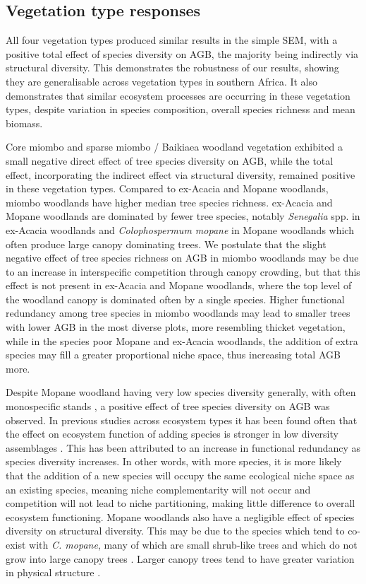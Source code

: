 \documentclass[11pt,a4paper]{article}
\begin{document}
\subsection{Vegetation type responses}

All four vegetation types produced similar results in the simple SEM, with a positive total effect of species diversity on AGB, the majority being indirectly via structural diversity. This demonstrates the robustness of our results, showing they are generalisable across vegetation types in southern Africa. It also demonstrates that similar ecosystem processes are occurring in these vegetation types, despite variation in species composition, overall species richness and mean biomass.

Core miombo and sparse miombo / Baikiaea woodland vegetation exhibited a small negative direct effect of tree species diversity on AGB, while the total effect, incorporating the indirect effect via structural diversity, remained positive in these vegetation types. Compared to ex-Acacia and Mopane woodlands, miombo woodlands have higher median tree species richness. ex-Acacia and Mopane woodlands are dominated by fewer tree species, notably \textit{Senegalia} spp. in ex-Acacia woodlands and \textit{Colophospermum mopane} in Mopane woodlands which often produce large canopy dominating trees. We postulate that the slight negative effect of tree species richness on AGB in miombo woodlands may be due to an increase in interspecific competition through canopy crowding, but that this effect is not present in ex-Acacia and Mopane woodlands, where the top level of the woodland canopy is dominated often by a single species. Higher functional redundancy among tree species in miombo woodlands may lead to smaller trees with lower AGB in the most diverse plots, more resembling thicket vegetation, while in the species poor Mopane and ex-Acacia woodlands, the addition of extra species may fill a greater proportional niche space, thus increasing total AGB more. 

Despite Mopane woodland having very low species diversity generally, with often monospecific stands \citep{Timberlake2010}, a positive effect of tree species diversity on AGB was observed. In previous studies across ecosystem types it has been found often that the effect on ecosystem function of adding species is stronger in low diversity assemblages \citep{Hector2007}. This has been attributed to an increase in functional redundancy as species diversity increases. In other words, with more species, it is more likely that the addition of a new species will occupy the same ecological niche space as an existing species, meaning niche complementarity will not occur and competition will not lead to niche partitioning, making little difference to overall ecosystem functioning. Mopane woodlands also have a negligible effect of species diversity on structural diversity. This may be due to the species which tend to co-exist with \textit{C. mopane}, many of which are small shrub-like trees and which do not grow into large canopy trees \citep{Timberlake2010}. Larger canopy trees tend to have greater variation in physical structure \citep{Seidel2019}.
\end{document}
